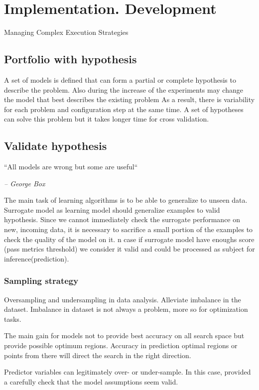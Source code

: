 \chapter{Implementation. Development}

Managing Complex Execution Strategies

\section{Portfolio with hypothesis}
A set of models is defined that can form a partial or complete hypothesis to describe the problem.
Also during the increase of the experiments may change the model that best describes the existing problem
As a result, there is variability for each problem and configuration step at the same time. 
A set of hypotheses can solve this problem but it takes longer time for cross validation.

\section{Validate hypothesis}
    \epigraph{``All models are wrong but some are useful``}{\textit{– George Box}}

    The main task of learning algorithms is to be able to generalize to unseen data. Surrogate model as learning model should generalize examples to valid hypothesis. 
    Since we cannot immediately check the surrogate performance on new, incoming data, it is necessary to sacrifice a small portion of the examples to check the quality of the model on it.
    n case if surrogate model have enoughs score (pass metrics threshold) we consider it valid and could be processed as subject for inference(prediction).

    \subsection{Sampling strategy}
    Oversampling and undersampling in data analysis. Alleviate imbalance in the dataset. 
    Imbalance in dataset is not always a problem, more so for optimization tasks. 

    The main gain for models not to provide best accuracy on all search space but provide possible optimum regions.
    Accuracy in prediction optimal regions or points from there will direct the search in the right direction.

    Predictor variables can legitimately over- or under-sample. 
    In this case, provided a carefully check that the model assumptions seem valid.

